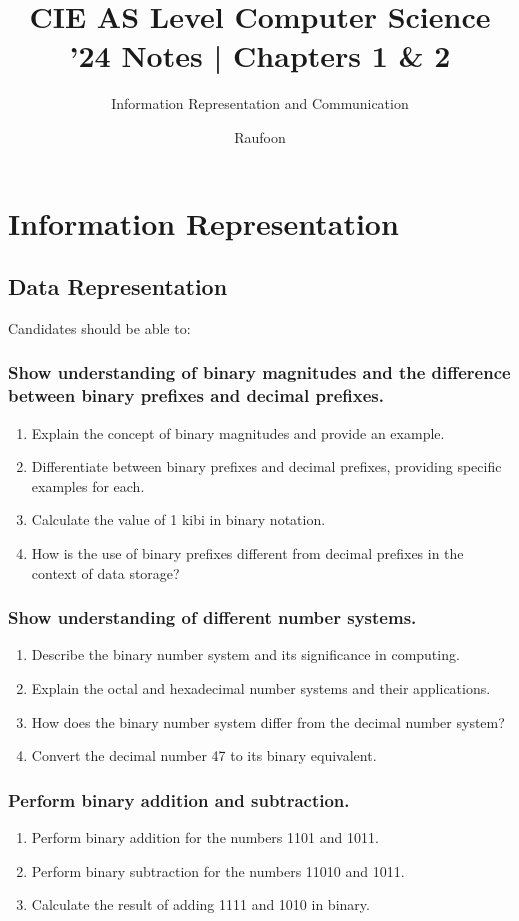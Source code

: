 \documentclass[a4paper]{article}
\title{CIE AS Level Computer Science '24 Notes | Chapters 1 \& 2}
\author{Information Representation and Communication}
\date{Raufoon}
\begin{document}
\maketitle

\section{Information Representation}
\subsection{Data Representation}
Candidates should be able to:
\subsubsection{Show understanding of binary magnitudes and the difference between binary prefixes and decimal prefixes.}
\begin{enumerate}
  \item Explain the concept of binary magnitudes and provide an example.
  \item Differentiate between binary prefixes and decimal prefixes, providing specific examples for each.
  \item Calculate the value of 1 kibi in binary notation.
  \item How is the use of binary prefixes different from decimal prefixes in the context of data storage?
\end{enumerate}

\subsubsection{Show understanding of different number systems.}
\begin{enumerate}
  \item Describe the binary number system and its significance in computing.
  \item Explain the octal and hexadecimal number systems and their applications.
  \item How does the binary number system differ from the decimal number system?
  \item Convert the decimal number 47 to its binary equivalent.
\end{enumerate}

\subsubsection{Perform binary addition and subtraction.}
\begin{enumerate}
  \item Perform binary addition for the numbers 1101 and 1011.
  \item Perform binary subtraction for the numbers 11010 and 1011.
  \item Calculate the result of adding 1111 and 1010 in binary.
\end{enumerate}
\end{document}
